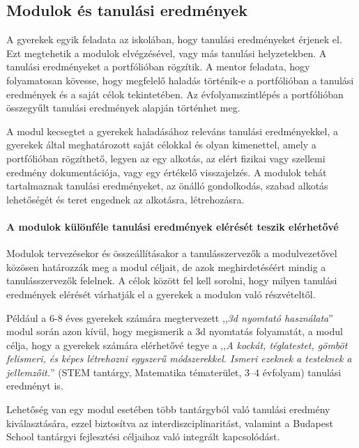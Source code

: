 \subsection{Modulok és tanulási eredmények}
\label{sec:modulok_es_tanulasi_eredmenyek}
A gyerekek egyik feladata az iskolában, hogy tanulási eredményeket
érjenek el. Ezt megtehetik a modulok elvégzésével, vagy más tanulási
helyzetekben.
A tanulási eredményeket a portfólióban rögzítik. A
mentor feladata, hogy folyamatosan kövesse, hogy megfelelő haladás
történik-e a portfólióban a tanulási eredmények és a saját célok
tekintetében. Az évfolyamszintlépés a portfólióban összegyűlt tanulási
eredmények alapján történhet meg.

A modul kecsegtet a gyerekek haladásához releváns tanulási
eredményekkel, a gyerekek által meghatározott saját célokkal és olyan
kimenettel, amely a portfólióban rögzíthető, legyen az egy alkotás, az
elért fizikai vagy szellemi eredmény dokumentációja, vagy egy értékelő
visszajelzés. A modulok tehát tartalmaznak tanulási eredményeket, az
önálló gondolkodás, szabad alkotás lehetőségét és teret engednek az
alkotásra, létrehozásra.

\paragraph{A modulok különféle tanulási eredmények elérését teszik
      elérhetővé}

Modulok tervezésekor és összeállításakor a tanulásszervezők a
modulvezetővel közösen határozzák meg a modul céljait, de azok
meghirdetéséért mindig a tanulásszervezők felelnek. A célok között fel
kell sorolni, hogy milyen tanulási eredmények elérését várhatják el a
gyerekek a modulon való részvételtől.

Például a 6-8 éves gyerekek számára megtervezett ,,\emph{3d nyomtató
      használata}'' modul során azon kívül, hogy megismerik a 3d nyomtatás
folyamatát, a modul célja, hogy a gyerekek számára elérhetővé tegye a
,,\emph{A kockát, téglatestet, gömböt felismeri, és képes létrehozni
      egyszerű módszerekkel. Ismeri ezeknek a testeknek a jellemzőit.}'' (STEM
tantárgy, Matematika tématerület, 3--4 évfolyam) tanulási eredményt is.

Lehetőség van egy modul esetében több tantárgyból való tanulási eredmény
kiválasztására, ezzel biztosítva az interdiszciplinaritást, valamint a
Budapest School tantárgyi fejlesztési céljaihoz való integrált
kapcsolódást.

